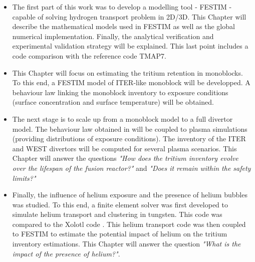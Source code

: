 \begin{itemize}
    \item \textbf{} \newline
The first part of this work was to develop a modelling tool - FESTIM - capable of solving hydrogen transport problem in 2D/3D.
This Chapter will describe the mathematical models used in FESTIM as well as the global numerical implementation.
Finally, the analytical verification and experimental validation strategy will be explained.
This last point includes a code comparison with the reference code TMAP7.
    \item \textbf{} \newline
This Chapter will focus on estimating the tritium retention in monoblocks.
To this end, a FESTIM model of ITER-like monoblock will be developped.
A behaviour law linking the monoblock inventory to exposure conditions (surface concentration and surface temperature) will be obtained.
    \item \textbf{} \newline
The next stage is to scale up from a monoblock model to a full divertor model.
The behaviour law obtained in  will be coupled to plasma simulations (providing distributions of exposure conditions).
The inventory of the ITER and WEST divertors will be computed for several plasma scenarios.
This Chapter will answer the questions \textit{"How does the tritium inventory evolve over the lifespan of the fusion reactor?"} and
\textit{"Does it remain within the safety limits?"}
    \item \textbf{} \newline
Finally, the influence of helium exposure and the presence of helium bubbles was studied.
To this end, a finite element solver was first developed to simulate helium transport and clustering in tungsten.
This code was compared to the Xolotl code .
This helium transport code was then coupled to FESTIM to estimate the potential impact of helium on the tritium inventory estimations.
This Chapter will answer the question \textit{"What is the impact of the presence of helium?"}.
\end{itemize}
